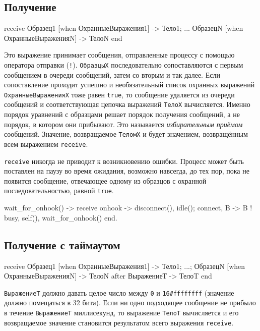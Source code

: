 \subsection{Получение}

\begin{erlangru}
receive
    Образец1 [when ОхранныеВыражения1] ->
        Тело1;
    ...
    ОбразецN [when ОхранныеВыраженияN] ->
        ТелоN      %
end
\end{erlangru}

Это выражение принимает сообщения, отправленные процессу с помощью оператора 
отправки (\texttt{!}). \texttt{ОбразцыX} последовательно сопоставляются с первым
сообщением в очереди сообщений, затем со вторым и так далее.  Если сопоставление
проходит успешно и необязательный список охранных выражений 
\texttt{ОхранныеВы\-раженияX} тоже равен \texttt{true}, то сообщение удаляется из 
очереди сообщений и соответствующая цепочка выражений \texttt{ТелоX} вычисляется. 
Именно порядок уравнений с образцами решает порядок получения сообщений, а не 
порядок, в котором они прибывают.  Это называется \emph{избирательным приёмом}
сообщений.  Значение, возвращаемое \texttt{ТеломX} и будет значением, возвращённым
всем выражением \texttt{receive}.

\texttt{receive} никогда не приводит к возникновению ошибки. Процесс может быть
поставлен на паузу во время ожидания, возможно навсегда, до тех пор, пока не 
появится сообщение, отвечающее одному из образцов с охранной последовательностью,
равной \texttt{true}.

\newpage
\begin{erlang}
wait_for_onhook() ->
    receive
        onhook ->
            disconnect(),
            idle();
        {connect, B} ->
            B ! {busy, self()},
            wait_for_onhook()
    end.
\end{erlang}


\subsection{Получение с таймаутом}

\begin{erlangru}
receive
    Образец1 [when ОхранныеВыражения1] ->
        Тело1;
        ...;
    ОбразецN [when ОхранныеВыраженияN] ->
        ТелоN
after
    ВыражениеТ ->
        ТелоT
end
\end{erlangru}

\texttt{ВыражениеТ} должно давать целое число между \texttt{0} и 
\texttt{16\#ffffffff} (значение должно помещаться в 32 бита). Если ни одно 
подходящее сообщение не прибыло в течение \texttt{ВыражениеТ} миллисекунд, то
выражение \texttt{ТелоT} вычисляется и его возвращаемое значение становится 
результатом всего выражения \texttt{receive}.

